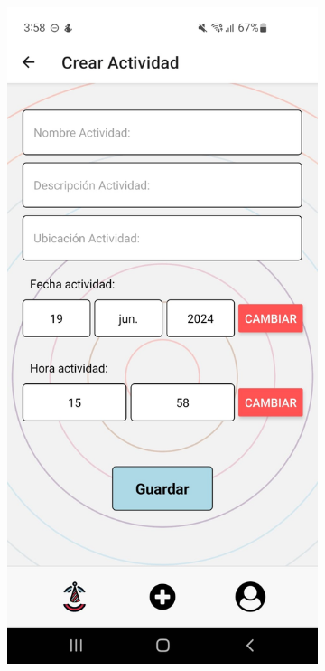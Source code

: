 \clearpage
\vspace*{\fill}
\begin{figure}[H]
    \centering
    \begin{subfigure}{0.45\textwidth}
        \centering
        \includegraphics[width=\linewidth]{imagenes/Capturas/CrearActividad.jpeg}

\end{subfigure}
\end{figure}
